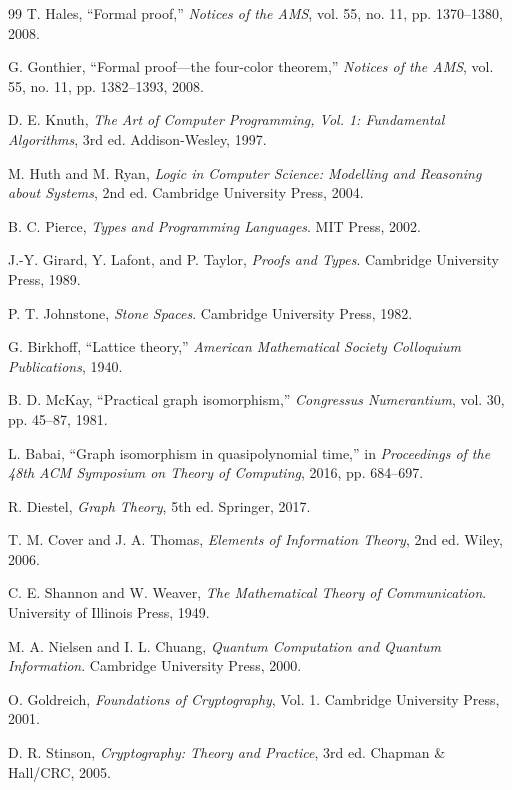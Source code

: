 \documentclass[11pt]{article}
\begin{document}
\begin{thebibliography}{99}
 T. Hales, ``Formal proof,'' \emph{Notices of the AMS}, vol. 55, no. 11, pp. 1370--1380, 2008.

 G. Gonthier, ``Formal proof---the four-color theorem,'' \emph{Notices of the AMS}, vol. 55, no. 11, pp. 1382--1393, 2008.

 D. E. Knuth, \emph{The Art of Computer Programming, Vol. 1: Fundamental Algorithms}, 3rd ed. Addison-Wesley, 1997.

 M. Huth and M. Ryan, \emph{Logic in Computer Science: Modelling and Reasoning about Systems}, 2nd ed. Cambridge University Press, 2004.

 B. C. Pierce, \emph{Types and Programming Languages}. MIT Press, 2002.

 J.-Y. Girard, Y. Lafont, and P. Taylor, \emph{Proofs and Types}. Cambridge University Press, 1989.

 P. T. Johnstone, \emph{Stone Spaces}. Cambridge University Press, 1982.

 G. Birkhoff, ``Lattice theory,'' \emph{American Mathematical Society Colloquium Publications}, 1940.

 B. D. McKay, ``Practical graph isomorphism,'' \emph{Congressus Numerantium}, vol. 30, pp. 45--87, 1981.

 L. Babai, ``Graph isomorphism in quasipolynomial time,'' in \emph{Proceedings of the 48th ACM Symposium on Theory of Computing}, 2016, pp. 684--697.

 R. Diestel, \emph{Graph Theory}, 5th ed. Springer, 2017.

 T. M. Cover and J. A. Thomas, \emph{Elements of Information Theory}, 2nd ed. Wiley, 2006.

 C. E. Shannon and W. Weaver, \emph{The Mathematical Theory of Communication}. University of Illinois Press, 1949.

 M. A. Nielsen and I. L. Chuang, \emph{Quantum Computation and Quantum Information}. Cambridge University Press, 2000.

 O. Goldreich, \emph{Foundations of Cryptography}, Vol. 1. Cambridge University Press, 2001.

 D. R. Stinson, \emph{Cryptography: Theory and Practice}, 3rd ed. Chapman \& Hall/CRC, 2005.


\end{thebibliography}
\end{document}
